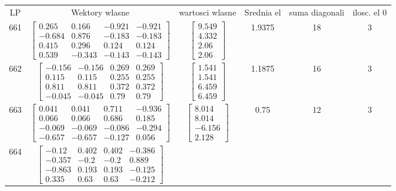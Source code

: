 \documentclass[a4paper,12pt]{article}
\begin{document}
\bgroup {} \vspace{0.2in} \begin{tabular}{c c c c c c}
LP &Wektory wlasne & wartosci wlasne & Srednia el & suma diagonali & ilosc. el 0\\
661
&
$\begin{bmatrix} 0.265 & 0.166 & -0.921 & -0.921 \\ -0.684 & 0.876 & -0.183 & -0.183 \\ 0.415 & 0.296 & 0.124 & 0.124 \\ 0.539 & -0.343 & -0.143 & -0.143 \end{bmatrix}$
&
$\begin{bmatrix} 9.549 \\ 4.332 \\ 2.06 \\ 2.06 \end{bmatrix}$
&
1.9375
&
18
&
3
\\
662
&
$\begin{bmatrix} -0.156 & -0.156 & 0.269 & 0.269 \\ 0.115 & 0.115 & 0.255 & 0.255 \\ 0.811 & 0.811 & 0.372 & 0.372 \\ -0.045 & -0.045 & 0.79 & 0.79 \end{bmatrix}$
&
$\begin{bmatrix} 1.541 \\ 1.541 \\ 6.459 \\ 6.459 \end{bmatrix}$
&
1.1875
&
16
&
3
\\
663
&
$\begin{bmatrix} 0.041 & 0.041 & 0.711 & -0.936 \\ 0.066 & 0.066 & 0.686 & 0.185 \\ -0.069 & -0.069 & -0.086 & -0.294 \\ -0.657 & -0.657 & -0.127 & 0.056 \end{bmatrix}$
&
$\begin{bmatrix} 8.014 \\ 8.014 \\ -6.156 \\ 2.128 \end{bmatrix}$
&
0.75
&
12
&
3
\\
664
&
$\begin{bmatrix} -0.12 & 0.402 & 0.402 & -0.386 \\ -0.357 & -0.2 & -0.2 & 0.889 \\ -0.863 & 0.193 & 0.193 & -0.125 \\ 0.335 & 0.63 & 0.63 & -0.212 \end{bmatrix}$

\end{tabular}
\end{document}
